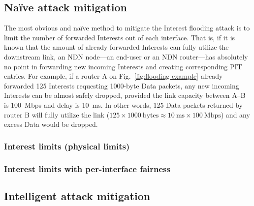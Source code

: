 \subsection{Na\"{i}ve attack mitigation}



The most obvious and na\"{i}ve method to mitigate the Interest flooding attack is to limit the number of forwarded Interests out of each interface. 
That is, if it is known that the amount of already forwarded Interests can fully utilize the downstream link, an NDN node---an end-user or an NDN router---has absolutely no point in forwarding new incoming Interests and creating corresponding PIT entries.
For example, if a router A on Fig.~\ref{fig:flooding example} already forwarded 125 Interests requesting 1000-byte Data packets, any new incoming Interests can be almost safely dropped, provided the link capacity between A--B is 100~Mbps and delay is 10~ms.
In other words, 125 Data packets returned by router B will fully utilize the link ($125 \times 1000 \mathrm{~bytes} \approx 10\mathrm{~ms} \times 100\mathrm{~Mbps}$) and any excess Data would be dropped.

\subsubsection{Interest limits (physical limits)}
\label{sec:physical limits}




\subsubsection{Interest limits with per-interface fairness}
\label{sec:queuing}




\subsection{Intelligent attack mitigation}

